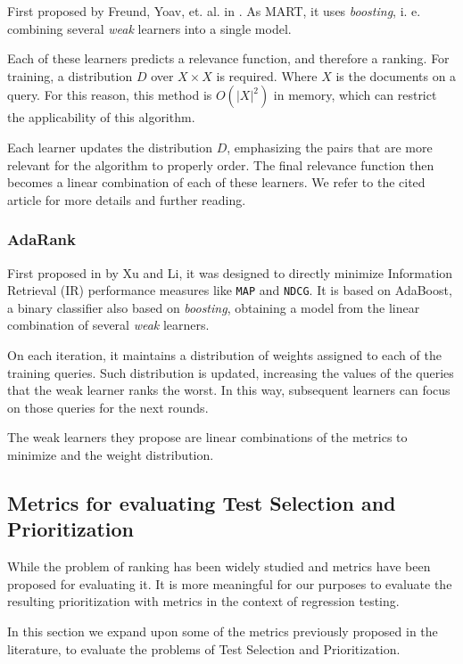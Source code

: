 First proposed by Freund, Yoav, et. al. in \cite{10.5555/945365.964285}. As MART, it uses \emph{boosting}, i. e. combining
several \emph{weak} learners into a single model.

Each of these learners predicts a relevance function, and therefore a ranking. For training, a distribution $D$ over
$X\times X$ is required. Where $X$ is the documents on a query. For this reason, this method is $O(|X|^2)$ in memory, which
can restrict the applicability of this algorithm. 

Each learner updates the distribution $D$, emphasizing the pairs that are more relevant for the algorithm
to properly order. The final relevance function then becomes a linear combination of each of these learners.
We refer to the cited article for more details and further reading.

\subsubsection{AdaRank}

First proposed in \cite{xuliadarank} by Xu and Li, it was designed to directly minimize Information Retrieval (IR) performance measures
like \texttt{MAP} and \texttt{NDCG}. It is based on AdaBoost, a binary classifier also based on \emph{boosting},
obtaining a model from the linear combination of several \emph{weak} learners.

On each iteration, it maintains a distribution of weights assigned to each of the training queries.
Such distribution is updated, increasing the values of the queries that the weak learner ranks the worst.
In this way, subsequent learners can focus on those queries for the next rounds.

The weak learners they propose are linear combinations of the metrics to minimize and the weight distribution.

\subsection{Metrics for evaluating Test Selection and Prioritization}
\label{sec:bg-metrics-tsp}

While the problem of ranking has been widely studied and metrics have been proposed for evaluating it. It is more
meaningful for our purposes to evaluate the resulting prioritization with metrics in the context of regression testing.

In this section we expand upon some of the metrics previously proposed in the literature, to evaluate the problems of Test Selection
and Prioritization.

